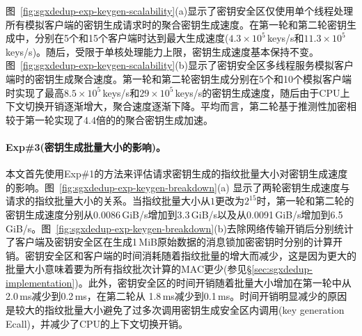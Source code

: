 图~\ref{fig:sgxdedup-exp-keygen-scalability}(a)显示了密钥安全区仅使用单个线程处理所有模拟客户端的密钥生成请求时的聚合密钥生成速度。在第一轮和第二轮密钥生成中，\sysnameS 分别在5个和15个客户端时达到最大生成速度($4.3\times 10^5$\,keys/s和$11.3\times 10^5$\,keys/s)。随后，受限于单核处理能力上限，密钥生成速度基本保持不变。图~\ref{fig:sgxdedup-exp-keygen-scalability}(b)显示了密钥安全区多线程服务模拟客户端时的密钥生成聚合速度。第一轮和第二轮密钥生成分别在5个和10个模拟客户端时实现了最高$8.5\times 10^5$\,keys/s和$29\times 10^5$\,keys/s的密钥生成速度，随后由于CPU上下文切换开销逐渐增大，聚合速度逐渐下降。平均而言，第二轮基于推测性加密相较于第一轮实现了4.4倍的的聚合密钥生成加速。

\paragraph*{Exp\#3(密钥生成批量大小的影响)。}

本文首先使用Exp\#1的方法来评估请求密钥生成的指纹批量大小对密钥生成速度的影响。图~\ref{fig:sgxdedup-exp-keygen-breakdown}(a) 显示了两轮密钥生成速度与请求的指纹批量大小的关系。当指纹批量大小从$1$更改为$2^{15}$时，第一轮和第二轮的密钥生成速度分别从0.0086\,GiB/s增加到3.3\,GiB/s以及从0.0091\,GiB/s增加到6.5\,GiB/s。图~\ref{fig:sgxdedup-exp-keygen-breakdown}(b)去除网络传输开销后分别统计了客户端及密钥安全区在生成1\,MiB原始数据的消息锁加密密钥时分别的计算开销。密钥安全区和客户端的时间消耗随着指纹批量的增大而减少，这是因为更大的批量大小意味着要为所有指纹批次计算的MAC更少(参见\S\ref{sec:sgxdedup-implementation})。此外，密钥安全区的时间开销随着批量大小增加在第一轮中从2.0\,ms减少到0.2\,ms，在第二轮从 1.8\,ms减少到0.1\,ms。时间开销明显减少的原因是较大的指纹批量大小避免了过多次调用密钥生成安全区内调用(key generation Ecall)，并减少了CPU的上下文切换开销。

